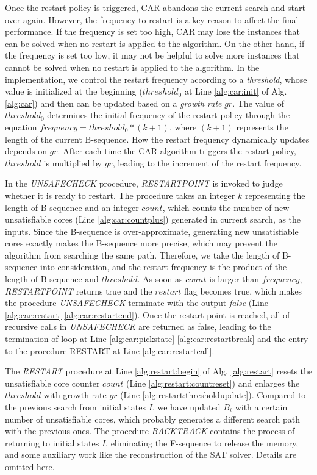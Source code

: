 Once the restart policy is triggered, CAR abandons the current search and start over again. However, the frequency to restart is a key reason to affect the final performance. If the frequency is set too high, CAR may lose the instances that can be solved when no restart is applied to the algorithm. On the other hand, if the frequency is set too low, it may not be helpful to solve more instances that cannot be solved when no restart is applied to the algorithm. In the implementation, we control the restart frequency according to a \emph{threshold}, whose value is initialized at the beginning ($threshold_0$ at Line \ref{alg:car:init} of Alg. \ref{alg:car}) and then can be updated based on a \emph{growth rate} $gr$. The value of $threshold_0$ determines the initial frequency of the restart policy through the equation $frequency = threshold_0 * (k+1)$, where $(k+1)$ represents the length of the current B-sequence. How the restart frequency dynamically updates depends on $gr$. After each time the CAR algorithm triggers the restart policy, $threshold$ is multiplied by $gr$, leading to the increment of the restart frequency. 

In the \emph{UNSAFECHECK} procedure,  \emph{RESTARTPOINT} is invoked to judge whether it is ready to restart. The procedure takes an integer $k$ representing the length of B-sequence and an integer $count$, which counts the number of new unsatisfiable cores (Line \ref{alg:car:countplus}) generated in current search, as the inputs. Since the B-sequence is over-approximate, generating new unsatisfiable cores exactly makes the B-sequence more precise, which may prevent the algorithm from searching the same path. Therefore, we take the length of B-sequence into consideration, and the restart frequency is the product of the length of B-sequence and $threshold$. As soon as  $count$ is larger than $frequency$, \emph{RESTARTPOINT} returns true and the $restart$ flag becomes true, which makes the procedure \emph{UNSAFECHECK} terminate with the output \emph{false} (Line \ref{alg:car:restart}-\ref{alg:car:restartend}). Once the restart point is reached, all of recursive calls in \emph{UNSAFECHECK} are returned as false, leading to the termination of loop at Line \ref{alg:car:pickstate}-\ref{alg:car:restartbreak} and the entry to the procedure RESTART at Line \ref{alg:car:restartcall}.

The \emph{RESTART} procedure at Line \ref{alg:restart:begin} of Alg. \ref{alg:restart} resets the unsatisfiable core counter $count$ (Line \ref{alg:restart:countreset}) and enlarges the $threshold$ with growth rate $gr$ (Line \ref{alg:restart:thresholdupdate}). Compared to the previous search from initial states $I$, we have updated $B_{i}$ with a certain number of unsatisfiable cores, which probably generates a different search path with the previous ones.
The procedure \emph{BACKTRACK} contains the process of returning to initial states $I$, eliminating the F-sequence to release the memory, and some auxiliary work like the reconstruction of the SAT solver. Details are omitted here.

